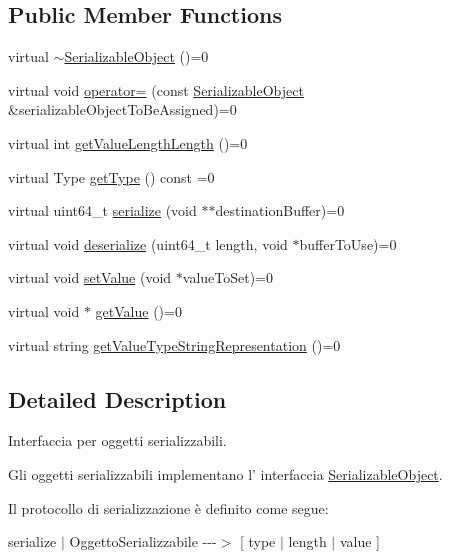 \subsection*{Public Member Functions}
\begin{DoxyCompactItemize}
\item 
virtual \hyperlink{class_serializable_object_ac0cc10f9b3dfd9b9c452fee752315e8a}{$\sim$SerializableObject} ()=0
\item 
virtual void \hyperlink{class_serializable_object_a94985a4c4221671eaf7b41ff6517d947}{operator=} (const \hyperlink{class_serializable_object}{SerializableObject} \&serializableObjectToBeAssigned)=0
\item 
virtual int \hyperlink{class_serializable_object_ac7f7f52078aa957078bf0583faf39ebf}{getValueLengthLength} ()=0
\item 
virtual Type \hyperlink{class_serializable_object_a64441fc2428eed4b1a3aab9130ec2a31}{getType} () const =0
\item 
virtual uint64\_\-t \hyperlink{class_serializable_object_ad9c873bfdba9fdfea311d61675cc6e2d}{serialize} (void $\ast$$\ast$destinationBuffer)=0
\item 
virtual void \hyperlink{class_serializable_object_a3f99c7957c0ac8e5edf5f2a5593f4d78}{deserialize} (uint64\_\-t length, void $\ast$bufferToUse)=0
\item 
virtual void \hyperlink{class_serializable_object_adf52c5c2bff1dbac9555adafdc2a6755}{setValue} (void $\ast$valueToSet)=0
\item 
virtual void $\ast$ \hyperlink{class_serializable_object_ad096d43507c2a903f5e17a9536b125ee}{getValue} ()=0
\item 
virtual string \hyperlink{class_serializable_object_af3cf94b6fb07b1a06e6cbac100994592}{getValueTypeStringRepresentation} ()=0
\end{DoxyCompactItemize}


\subsection{Detailed Description}
Interfaccia per oggetti serializzabili. 

Gli oggetti serializzabili implementano l' interfaccia \hyperlink{class_serializable_object}{SerializableObject}.

Il protocollo di serializzazione è definito come segue:

serialize $|$ OggettoSerializzabile -\/-\/-\/$>$ \mbox{[} type $|$ length $|$ value \mbox{]} 

